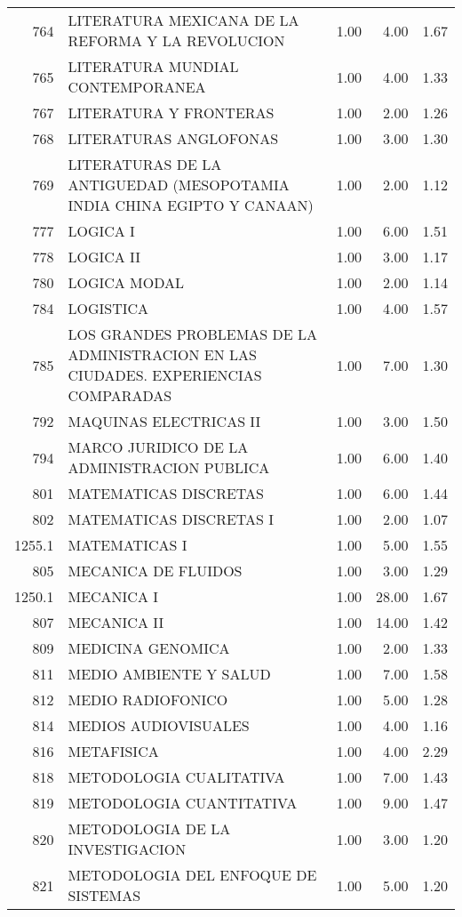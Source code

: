 \documentclass[12pt]{article}
\begin{document}
\begin{table}[ht]
\begin{tabular}{rlrrr}
  764 & LITERATURA MEXICANA DE LA REFORMA Y LA REVOLUCION & 1.00 & 4.00 & 1.67 \\ 
  765 & LITERATURA MUNDIAL CONTEMPORANEA & 1.00 & 4.00 & 1.33 \\ 
  767 & LITERATURA Y FRONTERAS & 1.00 & 2.00 & 1.26 \\ 
  768 & LITERATURAS ANGLOFONAS & 1.00 & 3.00 & 1.30 \\ 
  769 & LITERATURAS DE LA ANTIGUEDAD (MESOPOTAMIA INDIA CHINA EGIPTO Y CANAAN) & 1.00 & 2.00 & 1.12 \\ 
  777 & LOGICA I & 1.00 & 6.00 & 1.51 \\ 
  778 & LOGICA II & 1.00 & 3.00 & 1.17 \\ 
  780 & LOGICA MODAL & 1.00 & 2.00 & 1.14 \\ 
  784 & LOGISTICA & 1.00 & 4.00 & 1.57 \\ 
  785 & LOS GRANDES PROBLEMAS DE LA ADMINISTRACION EN LAS CIUDADES. EXPERIENCIAS COMPARADAS & 1.00 & 7.00 & 1.30 \\ 
  792 & MAQUINAS ELECTRICAS II & 1.00 & 3.00 & 1.50 \\ 
  794 & MARCO JURIDICO DE LA ADMINISTRACION PUBLICA & 1.00 & 6.00 & 1.40 \\ 
  801 & MATEMATICAS DISCRETAS & 1.00 & 6.00 & 1.44 \\ 
  802 & MATEMATICAS DISCRETAS I & 1.00 & 2.00 & 1.07 \\ 
  1255.1 & MATEMATICAS I & 1.00 & 5.00 & 1.55 \\ 
  805 & MECANICA DE FLUIDOS & 1.00 & 3.00 & 1.29 \\ 
  1250.1 & MECANICA I & 1.00 & 28.00 & 1.67 \\ 
  807 & MECANICA II & 1.00 & 14.00 & 1.42 \\ 
  809 & MEDICINA GENOMICA & 1.00 & 2.00 & 1.33 \\ 
  811 & MEDIO AMBIENTE Y SALUD & 1.00 & 7.00 & 1.58 \\ 
  812 & MEDIO RADIOFONICO & 1.00 & 5.00 & 1.28 \\ 
  814 & MEDIOS AUDIOVISUALES & 1.00 & 4.00 & 1.16 \\ 
  816 & METAFISICA & 1.00 & 4.00 & 2.29 \\ 
  818 & METODOLOGIA CUALITATIVA & 1.00 & 7.00 & 1.43 \\ 
  819 & METODOLOGIA CUANTITATIVA & 1.00 & 9.00 & 1.47 \\ 
  820 & METODOLOGIA DE LA INVESTIGACION & 1.00 & 3.00 & 1.20 \\ 
  821 & METODOLOGIA DEL ENFOQUE DE SISTEMAS & 1.00 & 5.00 & 1.20 \\ 

\end{tabular}
\end{table}
\end{document}
